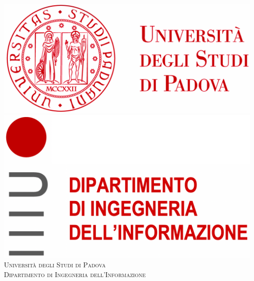 \begin{titlepage}
\begin{center}

\includegraphics[scale=0.2]{images/logo_unipd.png} \hfill \includegraphics[scale=0.2]{images/logo_dei.png}\\
\vspace{0.8cm}
\textsc{\LARGE Universit\`{a} degli Studi di Padova}\\
\vspace{0.45cm}
\textsc{\large Dipartimento di Ingegneria dell'Informazione}\\

\end{center}
\end{titlepage}
